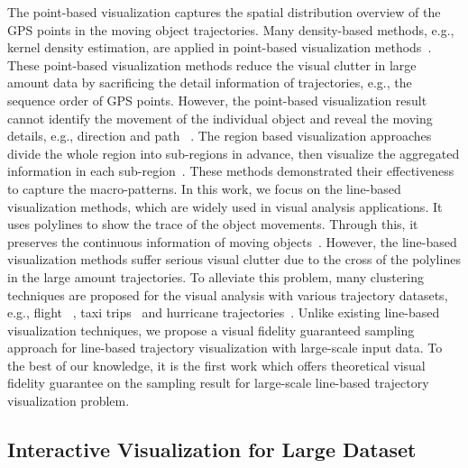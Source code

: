 The point-based visualization captures the spatial distribution overview of the GPS points in the moving object trajectories.
Many density-based methods, e.g., kernel density estimation, are applied in point-based visualization methods~\cite{liu2013vait,yang2016exploring,chae2014public,xie2008kernel, borruso2008network}.
These point-based visualization methods reduce the visual clutter in large amount data by sacrificing the detail information of trajectories, e.g., the sequence order of GPS points.
However, the point-based visualization result cannot identify the movement of the individual object and reveal the moving details, e.g.,  direction and path ~\cite{chen2015survey}.
The region based visualization approaches divide the whole region into sub-regions in advance, then visualize the aggregated information in each sub-region~\cite{guo2009flow,wood2010visualisation,von2015mobilitygraphs}.
These methods demonstrated their effectiveness to capture the macro-patterns.
In this work, we focus on the line-based visualization methods, which are widely used in visual analysis applications.
It uses polylines to show the trace of the object movements.
Through this, it preserves the continuous information of moving objects~\cite{guo2011tripvista,hurter2009fromdady}.
However, the line-based visualization methods suffer serious visual clutter due to the cross of the polylines in the large amount trajectories.
To alleviate this problem, many clustering techniques are proposed for the visual analysis with various trajectory datasets, e.g., flight ~\cite{ferreira2013vector}, taxi trips~\cite{rinzivillo2008visually} and hurricane trajectories~\cite{andrienko2017clustering}.
Unlike existing line-based visualization techniques, we propose a visual fidelity  guaranteed sampling approach for line-based trajectory visualization with large-scale input data.
To the best of our knowledge, it is the first work which offers theoretical visual fidelity guarantee on the sampling result for large-scale line-based trajectory visualization problem.





\subsection{Interactive Visualization for Large Dataset}\label{sec:interactive}

